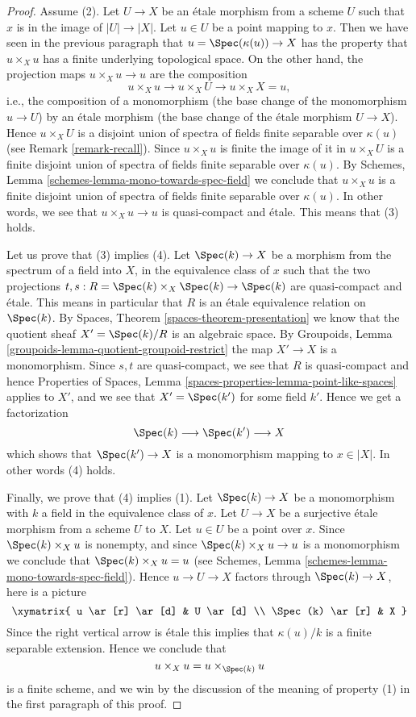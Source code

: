 \begin{proof}
\medskip\noindent
Assume (2). Let $U \to X$ be an \'etale morphism from a scheme $U$
such that $x$ is in the image of $|U| \to |X|$. Let $u \in U$ be
a point mapping to $x$. Then we have seen in the previous
paragraph that $u = \Spec(\kappa(u)) \to X$ has the property that
$u \times_X u$ has a finite underlying topological space. On the other
hand, the projection maps $u \times_X u \to u$ are the composition
$$
u \times_X u \longrightarrow
u \times_X U \longrightarrow
u \times_X X = u,
$$
i.e., the composition of a monomorphism (the base change of the monomorphism
$u \to U$) by an \'etale morphism (the base change of the \'etale morphism
$U \to X$). Hence $u \times_X U$ is a disjoint union of spectra of fields
finite separable over $\kappa(u)$ (see
Remark \ref{remark-recall}). Since $u \times_X u$ is finite the image
of it in $u \times_X U$ is a finite disjoint union of spectra of fields
finite separable over $\kappa(u)$. By
Schemes, Lemma \ref{schemes-lemma-mono-towards-spec-field}
we conclude that $u \times_X u$ is a finite disjoint union of spectra
of fields finite separable over $\kappa(u)$. In other words, we see that
$u \times_X u \to u$ is quasi-compact and \'etale. This means that (3) holds.

\medskip\noindent
Let us prove that (3) implies (4). Let $\Spec(k) \to X$ be a morphism
from the spectrum of a field into $X$, in the equivalence class of $x$
such that the two projections
$t, s : R = \Spec(k) \times_X \Spec(k)  \to \Spec(k)$
are quasi-compact and \'etale.
This means in particular
that $R$ is an \'etale equivalence relation on $\Spec(k)$.
By Spaces, Theorem \ref{spaces-theorem-presentation}
we know that the quotient sheaf
$X' = \Spec(k)/R$ is an algebraic space. By
Groupoids, Lemma \ref{groupoids-lemma-quotient-groupoid-restrict}
the map $X' \to X$ is a monomorphism.
Since $s, t$ are quasi-compact, we see that $R$ is quasi-compact and hence
Properties of Spaces,
Lemma \ref{spaces-properties-lemma-point-like-spaces}
applies to $X'$, and we see that
$X' = \Spec(k')$ for some field $k'$. Hence we get a factorization
$$
\Spec(k) \longrightarrow
\Spec(k') \longrightarrow X
$$
which shows that $\Spec(k') \to X$ is a monomorphism mapping
to $x \in |X|$. In other words (4) holds.

\medskip\noindent
Finally, we prove that (4) implies (1). Let $\Spec(k) \to X$
be a monomorphism with $k$ a field in the equivalence class of $x$.
Let $U \to X$ be a surjective \'etale morphism from a scheme $U$ to $X$.
Let $u \in U$ be a point over $x$. Since $\Spec(k) \times_X u$
is nonempty, and since $\Spec(k) \times_X u \to u$ is a monomorphism
we conclude that $\Spec(k) \times_X u = u$ (see
Schemes, Lemma \ref{schemes-lemma-mono-towards-spec-field}).
Hence $u \to U \to X$ factors through $\Spec(k) \to X$, here is
a picture
$$
\xymatrix{
u \ar[r] \ar[d] & U \ar[d] \\
\Spec(k) \ar[r] & X
}
$$
Since the right vertical arrow is \'etale this implies that
$\kappa(u)/k$ is a finite separable extension. Hence we conclude that
$$
u \times_X u = u \times_{\Spec(k)} u
$$
is a finite scheme, and we win by the discussion of the meaning of property
(1) in the first paragraph of this proof.
\end{proof}

